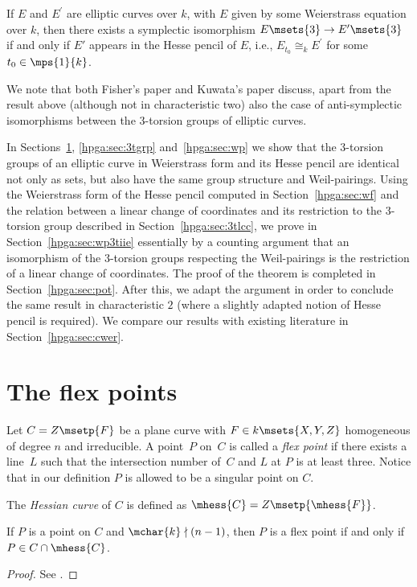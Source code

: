 \begin{Theorem}\label{hpga:thm:mt} If $E$ and $E^\prime$ are elliptic curves over $k$, with $E$ given by some Weierstrass equation over $k$, then there exists a symplectic isomorphism $E\msets{3}\rightarrow E^\prime\msets{3}$ if and only if $E'$ appears in the Hesse pencil of $E$, i.e., $E_{t_0}\cong_kE^\prime$ for some $t_0\in\mps{1}{k}$.
\end{Theorem}

We note that both Fisher's paper \cite{fisher2012} and Kuwata's paper \cite{kuwata2012} discuss, apart from the result above (although not in characteristic two) also the case of anti-symplectic isomorphisms between the $3$-torsion groups of elliptic curves.

In Sections~\ref{hpga:sec:fp}, \ref{hpga:sec:3tgrp} and~\ref{hpga:sec:wp} we show that the 3-torsion groups of an elliptic curve in Weierstrass form and its Hesse pencil are identical not only as sets, but also have the same group structure and Weil-pairings. Using the Weierstrass form of the Hesse pencil computed in Section~\ref{hpga:sec:wf} and the relation between a linear change of coordinates and its restriction to the 3-torsion group described in Section~\ref{hpga:sec:3tlcc}, we prove in Section~\ref{hpga:sec:wp3tiie} essentially by a counting argument that an
isomorphism of the 3-torsion groups respecting the Weil-pairings is the restriction of a linear change of coordinates. The proof of the theorem is completed in Section~\ref{hpga:sec:pot}. After this, we adapt the argument in order to conclude the same result in characteristic $2$ (where a slightly adapted notion of Hesse pencil is required). We compare our results with existing literature in Section~\ref{hpga:sec:cwer}.

\section{The flex points}\label{hpga:sec:fp}

Let $C=Z\msetp{F}$ be a plane curve with $F\in k\msets{X,Y,Z}$ homogeneous of degree $n$ and irreducible. A point~$P$ on~$C$ is called a \emph{flex point} if there exists a line~$L$ such that the intersection number of~$C$ and $L$ at $P$ is at least three. Notice that in our definition $P$ is allowed to be a singular point on $C$.

The \emph{Hessian curve} of $C$ is defined as $\mhess{C}=Z\msetp{\mhess{F}}$.

\begin{Proposition}\label{two} If $P$ is a point on $C$ and $\mchar{k}\nmid (n-1)$, then $P$ is a flex point if
and only if $P\in C\cap\mhess{C}$.
\end{Proposition}
\begin{proof}See \cite[Exercise 5.23]{fulton2008}.
\end{proof}

